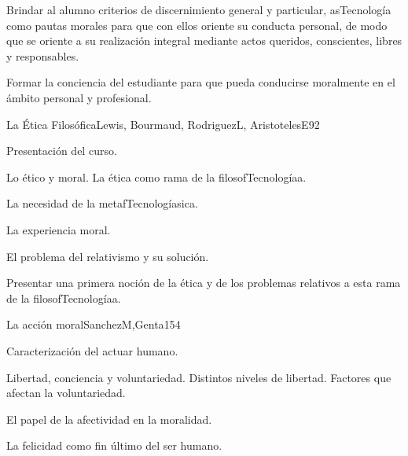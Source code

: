 \begin{syllabus}


\begin{justification}
Brindar al alumno criterios de discernimiento general y particular, asTecnología como pautas morales para que con ellos oriente su conducta personal, de modo que se oriente a su realización integral mediante actos queridos, conscientes, libres y responsables. 
\end{justification}

\begin{goals}
\item Formar la conciencia del estudiante para que pueda conducirse moralmente en el ámbito personal y profesional.
\end{goals}

\begin{outcomes}
\end{outcomes}

\begin{unit}{La Ética Filosófica}{Lewis, Bourmaud, RodriguezL, AristotelesE}{9}{2}
\begin{topics}
	\item	Presentación del curso. 
	\item	Lo ético y moral. La ética como rama de la filosofTecnologíaa.
	\item	La necesidad de la metafTecnologíasica.
	\item	La experiencia moral.
	\item	El problema del relativismo y su solución.
	
\end{topics}
\begin{unitgoals}
	\item Presentar una primera noción de la ética y de los problemas relativos a esta rama de la filosofTecnologíaa.
\end{unitgoals}
\end{unit}

\begin{unit}{La acción moral}{SanchezM,Genta}{15}{4}
\begin{topics}
	\item	Caracterización del actuar humano. 
	\item	Libertad, conciencia y voluntariedad. Distintos niveles de libertad. Factores que afectan la voluntariedad.
	\item	El papel de la afectividad en la moralidad.
	\item	La felicidad como fin último del ser humano.


\end{topics}
\end{unit}
\end{syllabus}
